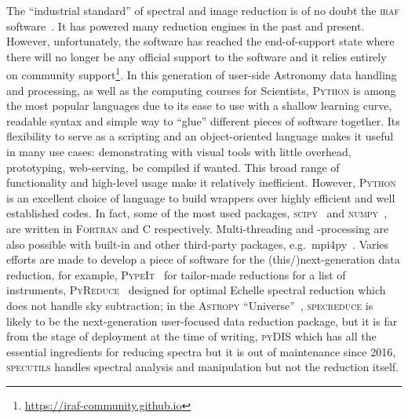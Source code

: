 \documentclass[fleqn,usenatbib]{mnras}
\begin{document}
The ``industrial standard'' of spectral and image reduction is of no doubt the
\textsc{iraf} software~\citep{1986SPIE..627..733T, 1993ASPC...52..173T}. It has powered many
reduction engines in the past and present. However, unfortunately, the software has reached
the end-of-support state where there will no longer be any official support to the software
and it relies entirely on community support\footnote{\url{https://iraf-community.github.io}}.
In this generation of user-side Astronomy data handling and processing, as well as the
computing courses for Scientists, \textsc{Python} is among the most popular languages due to
its ease to use with a shallow learning curve, readable syntax and simple way to ``glue''
different pieces of software together. Its flexibility to serve as a scripting and an
object-oriented language makes it useful in many use cases: demonstrating with visual tools
with little overhead, prototyping, web-serving, be compiled if wanted. This broad range of
functionality and high-level usage make it relatively inefficient. However, \textsc{Python}
is an excellent choice of language to build wrappers over highly efficient and well
established codes. In fact, some of the most used packages,
\textsc{scipy}~\citep{2020SciPy-NMeth} and \textsc{numpy}~\citep{2020NumPy-Array},
are written in \textsc{Fortran} and \textsc{C} respectively. Multi-threading and -processing
are also possible with built-in and other third-party packages, e.g.\ mpi4py~\citep{DALCIN20111124}. 
Varies efforts are made to develop a piece of software for the (this/)next-generation data reduction,
for example, \textsc{PypeIt}~\citep{pypeit:zenodo, pypeit:joss_pub} for tailor-made reductions
for a list of instruments, \textsc{PyReduce}~\citep{2021A&A...646A..32P} designed for optimal
Echelle spectral reduction which does not handle sky subtraction;
in the \textsc{Astropy} ``Universe''~\citep{astropy:2013, astropy:2018}, \textsc{specreduce}
is likely to be the next-generation user-focused data reduction package, but it is far from
the stage of deployment at the time of writing, \textsc{pyDIS} which has all the essential
ingredients for reducing spectra but it is out of maintenance since 2016, \textsc{specutils}
handles spectral analysis and manipulation but not the reduction itself.
\end{document}
